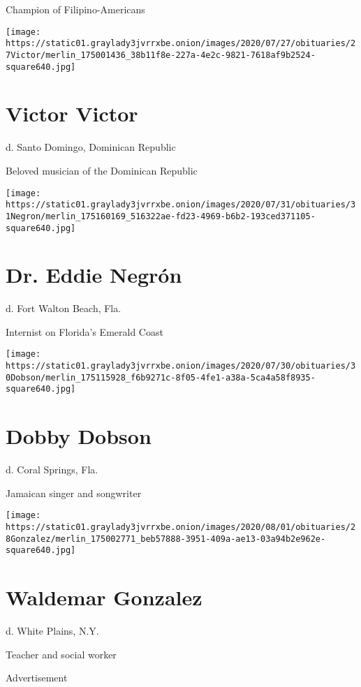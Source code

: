 Champion of Filipino-Americans

\texttt{[image: https://static01.graylady3jvrrxbe.onion/images/2020/07/27/obituaries/27Victor/merlin\_175001436\_38b11f8e-227a-4e2c-9821-7618af9b2524-square640.jpg]}

\hypertarget{victor-victor}{%
\section{Victor Victor}\label{victor-victor}}

d. Santo Domingo, Dominican Republic

Beloved musician of the Dominican Republic

\texttt{[image: https://static01.graylady3jvrrxbe.onion/images/2020/07/31/obituaries/31Negron/merlin\_175160169\_516322ae-fd23-4969-b6b2-193ced371105-square640.jpg]}

\hypertarget{dr-eddie-negruxf3n}{%
\section{Dr. Eddie Negrón}\label{dr-eddie-negruxf3n}}

d. Fort Walton Beach, Fla.

Internist on Florida's Emerald Coast

\texttt{[image: https://static01.graylady3jvrrxbe.onion/images/2020/07/30/obituaries/30Dobson/merlin\_175115928\_f6b9271c-8f05-4fe1-a38a-5ca4a58f8935-square640.jpg]}

\hypertarget{dobby-dobson}{%
\section{Dobby Dobson}\label{dobby-dobson}}

d. Coral Springs, Fla.

Jamaican singer and songwriter

\texttt{[image: https://static01.graylady3jvrrxbe.onion/images/2020/08/01/obituaries/28Gonzalez/merlin\_175002771\_beb57888-3951-409a-ae13-03a94b2e962e-square640.jpg]}

\hypertarget{waldemar-gonzalez}{%
\section{Waldemar Gonzalez}\label{waldemar-gonzalez}}

d. White Plains, N.Y.

Teacher and social worker

Advertisement

